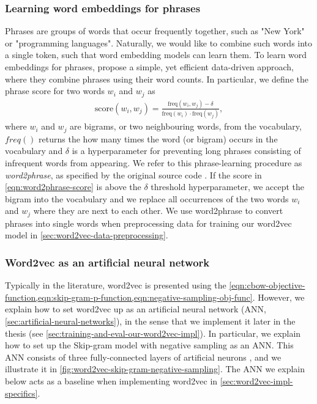\subsubsection{Learning word embeddings for phrases}
\label{sec:learning-word-embeddings-for-phrases}
Phrases are groups of words that occur frequently together, such as "New York" or "programming languages". Naturally, we would like to combine such words into a single token, such that word embedding models can learn them. To learn word embeddings for phrases, \cite[p. 5-6]{mikolov2013b} propose a simple, yet efficient data-driven approach, where they combine phrases using their word counts. In particular, we define the phrase score for two words $w_i$ and $w_j$ as
\begin{align}
    \text{score}(w_i, w_j) = \frac{\text{freq}(w_i, w_j) - \delta}{\text{freq}(w_i) \cdot \text{freq}(w_j)},
    \label{eqn:word2phrase-score}
\end{align}
where $w_i$ and $w_j$ are bigrams, or two neighbouring words, from the vocabulary, $freq()$ returns the how many times the word (or bigram) occurs in the vocabulary and $\delta$ is a hyperparameter for preventing long phrases consisting of infrequent words from appearing. We refer to this phrase-learning procedure as \textit{word2phrase}, as specified by the original source code \cite{Word2phraseCCode}. If the score in \cref{eqn:word2phrase-score} is above the $\delta$ threshold hyperparameter, we accept the bigram into the vocabulary and we replace all occurrences of the two words $w_i$ and $w_j$ where they are next to each other. We use word2phrase to convert phrases into single words when preprocessing data for training our word2vec model in \cref{sec:word2vec-data-preprocessing}.

\subsubsection{Word2vec as an artificial neural network}
\label{sec:word2vec-as-an-ann}
Typically in the literature, word2vec is presented using the \cref{eqn:cbow-objective-function,eqn:skip-gram-p-function,eqn:negative-sampling-obj-func}. However, we explain how to set word2vec up as an artificial neural network (ANN, \cref{sec:artificial-neural-networks}), in the sense that we implement it later in the thesis (see \cref{sec:training-and-eval-our-word2vec-impl}). In particular, we explain how to set up the Skip-gram model with negative sampling as an ANN. This ANN consists of three fully-connected layers of artificial neurons \cite{rong2016word2vec}, and we illustrate it in \cref{fig:word2vec-skip-gram-negative-sampling}. The ANN we explain below acts as a baseline when implementing word2vec in \cref{sec:word2vec-impl-specifics}.

